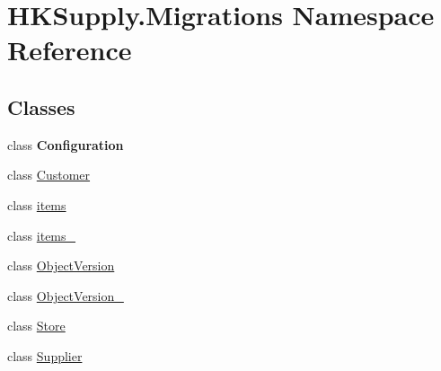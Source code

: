 \hypertarget{namespace_h_k_supply_1_1_migrations}{}\section{H\+K\+Supply.\+Migrations Namespace Reference}
\label{namespace_h_k_supply_1_1_migrations}
\subsection*{Classes}
\begin{DoxyCompactItemize}
\item 
class {\bfseries Configuration}
\item 
class \hyperlink{class_h_k_supply_1_1_migrations_1_1_customer}{Customer}
\item 
class \hyperlink{class_h_k_supply_1_1_migrations_1_1items}{items}
\item 
class \hyperlink{class_h_k_supply_1_1_migrations_1_1items__2}{items\+\_}
\item 
class \hyperlink{class_h_k_supply_1_1_migrations_1_1_object_version}{Object\+Version}
\item 
class \hyperlink{class_h_k_supply_1_1_migrations_1_1_object_version__2}{Object\+Version\+\_}
\item 
class \hyperlink{class_h_k_supply_1_1_migrations_1_1_store}{Store}
\item 
class \hyperlink{class_h_k_supply_1_1_migrations_1_1_supplier}{Supplier}
\end{DoxyCompactItemize}
